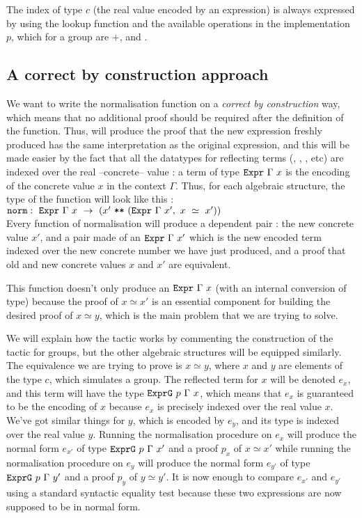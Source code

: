 The index of type $c$ (the real value encoded by an expression) is always expressed by using the lookup function  and the available operations in the implementation $p$, which for a group are $+$,  and .

	\subsection{A correct by construction approach}
\label{sect:correctByConstruction}

We want to write the normalisation function on a \emph{correct by construction} way, which means that no additional proof should be required after the definition of the function. Thus,  will produce the proof that the new expression freshly produced has the same interpretation as the original expression, and this will be made easier by the fact that all the datatypes for reflecting terms (, , , etc) are indexed over the real --concrete-- value : a term of type ${\mbox{\texttt{Expr}}}\ \Gamma\ x$ is the encoding of the concrete value $x$ in the context $\Gamma$.
Thus, for each algebraic structure, the type of the function  will look like this : \\
$\code{norm} :\ \code{Expr}\ \Gamma\ x\ \rightarrow\ (x'\ \code{**}\ (\code{Expr}\ \Gamma\ x',\ x\ \simeq\ x'))$ \\
Every function of normalisation  will produce a dependent pair : the new concrete value $x'$, and a pair made of an $\code{Expr}\ \Gamma\ x'$ which is the new encoded term indexed over the new concrete number we have just produced, and a proof that old and new concrete values $x$ and $x'$ are equivalent.

This function doesn't only produce an ${\mbox{\texttt{Expr}}}\ \Gamma\ x$ (with an internal conversion of type) because the proof of $x \simeq x'$ is an essential component for building the desired proof of $x \simeq y$, which is the main problem that we are trying to solve.


We will explain how the tactic works by commenting the construction of the tactic for groups, but the other algebraic structures will be equipped similarly. The equivalence we are trying to prove is $x \simeq y$, where $x$ and $y$ are elements of the type $c$, which  simulates a group. The reflected term for $x$ will be denoted $e_x$, and this term will have the type ${\mbox{\texttt{ExprG}}}\ p\ \Gamma\ x$, which means that $e_x$ is guaranteed to be the encoding of $x$ because $e_x$ is precisely indexed over the real value $x$.
We've got similar things for $y$, which is encoded by $e_y$, and its type is indexed over the real value $y$.
Running the normalisation procedure on $e_x$ will produce the normal form $e_{x'}$ of type ${\mbox{\texttt{ExprG}}}\ p\ \Gamma\ x'$ and a proof $p_x$ of $x \simeq x'$ while running the normalisation procedure on $e_y$ will produce the normal form $e_{y'}$ of type ${\mbox{\texttt{ExprG}}}\ p\ \Gamma\ y'$ and a proof $p_y$ of $y \simeq y'$.
It is now enough to compare $e_{x'}$ and $e_{y'}$ using a standard syntactic equality test  because these two expressions are now supposed to be in normal form.

